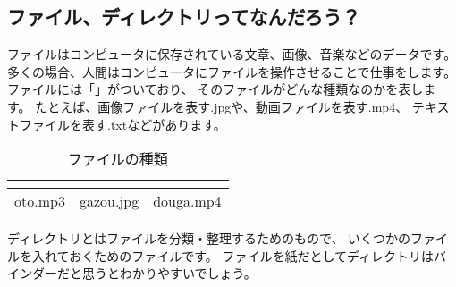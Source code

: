 \subsection{ファイル、ディレクトリってなんだろう？}
ファイルはコンピュータに保存されている文章、画像、音楽などのデータです。
多くの場合、人間はコンピュータにファイルを操作させることで仕事をします。
ファイルには「」がついており、
そのファイルがどんな種類なのかを表します。
たとえば、画像ファイルを表す.jpgや、動画ファイルを表す.mp4、
テキストファイルを表す.txtなどがあります。

\begin{table}[H]
  \begin{center}
    \caption[tab:files]{ファイルの種類}
    \begin{tabular}{|c|c|c|} \hline
    \begin{minipage}{0.3\hsize}
      \begin{center}
        
      \end{center}  
    \end{minipage} & 
    \begin{minipage}{0.3\hsize}
      \begin{center}
        
      \end{center}
    \end{minipage} &
    \begin{minipage}{0.3\hsize}
      \begin{center}
        
      \end{center} 
    \end{minipage} \\ \hline
    oto.mp3 & gazou.jpg & douga.mp4 \\ \hline
  \end{tabular}
 \end{center}
\end{table}


ディレクトリとはファイルを分類・整理するためのもので、
いくつかのファイルを入れておくためのファイルです。
ファイルを紙だとしてディレクトリはバインダーだと思うとわかりやすいでしょう。

